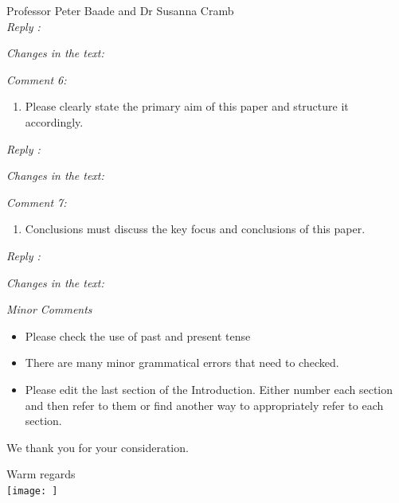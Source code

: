 \documentclass[11pt,a4paper,]{letter}
\providecommand{\tightlist}{%
  \setlength{\itemsep}{0pt}\setlength{\parskip}{0pt}}
\begin{document}
\begin{letter}{Professor Peter Baade and Dr Susanna Cramb\\}
\emph{Reply :}

\emph{Changes in the text:}

\emph{Comment 6: }

\begin{enumerate}
\def\labelenumi{\arabic{enumi}.}
\setcounter{enumi}{5}
\tightlist
\item
  Please clearly state the primary aim of this paper and structure it accordingly.
\end{enumerate}

\emph{Reply :}

\emph{Changes in the text:}

\emph{Comment 7: }

\begin{enumerate}
\def\labelenumi{\arabic{enumi}.}
\setcounter{enumi}{6}
\tightlist
\item
  Conclusions must discuss the key focus and conclusions of this paper.
\end{enumerate}

\emph{Reply :}

\emph{Changes in the text:}

\emph{Minor Comments}

\begin{itemize}
\tightlist
\item
  Please check the use of past and present tense
\item
  There are many minor grammatical errors that need to checked.
\item
  Please edit the last section of the Introduction. Either number each section and then refer to them or find another way to appropriately refer to each section.
\end{itemize}

We thank you for your consideration.
\closing{Warm regards\\[0.2cm]\hspace*{0.5cm}\texttt{[image: ]}}
\end{letter}
\end{document}

